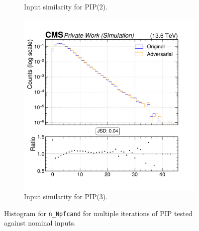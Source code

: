 \begin{figure}[h]
\begin{subfigure}[t]{0.32\textwidth}
    \caption{Input similarity for PIP(2).}
  \end{subfigure}\hfill
  \begin{subfigure}[t]{0.32\textwidth}
    \includegraphics[width=\linewidth]{media/output/features/compare/intprob_3/cmp_global_features_n_Npfcand.pdf}
    \caption{Input similarity for PIP(3).}
  \end{subfigure}

  \caption{Histogram for \texttt{n\_Npfcand} for multiple iterations of PIP tested against nominal inputs.}
  \label{fig:intprob_input_n_Npfcand}
\end{figure}
